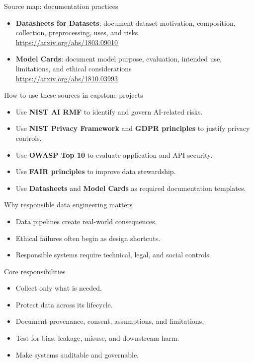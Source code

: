 \documentclass[aspectratio=43,12pt]{beamer}
\begin{document}
\begin{frame}{Source map: documentation practices}
\begin{itemize}
  \item \textbf{Datasheets for Datasets}: document dataset motivation, composition, collection, preprocessing, uses, and risks\\
  \url{https://arxiv.org/abs/1803.09010}
  \item \textbf{Model Cards}: document model purpose, evaluation, intended use, limitations, and ethical considerations\\
  \url{https://arxiv.org/abs/1810.03993}
\end{itemize}
\end{frame}

\begin{frame}{How to use these sources in capstone projects}
\begin{itemize}
  \item Use \textbf{NIST AI RMF} to identify and govern AI-related risks.
  \item Use \textbf{NIST Privacy Framework} and \textbf{GDPR principles} to justify privacy controls.
  \item Use \textbf{OWASP Top 10} to evaluate application and API security.
  \item Use \textbf{FAIR principles} to improve data stewardship.
  \item Use \textbf{Datasheets} and \textbf{Model Cards} as required documentation templates.
\end{itemize}
\end{frame}

\begin{frame}{Why responsible data engineering matters}
\begin{itemize}
  \item Data pipelines create real-world consequences.
  \item Ethical failures often begin as design shortcuts.
  \item Responsible systems require technical, legal, and social controls.
\end{itemize}
\end{frame}

\begin{frame}{Core responsibilities}
\begin{itemize}
  \item Collect only what is needed.
  \item Protect data across its lifecycle.
  \item Document provenance, consent, assumptions, and limitations.
  \item Test for bias, leakage, misuse, and downstream harm.
  \item Make systems auditable and governable.
\end{itemize}
\end{frame}
\end{document}
